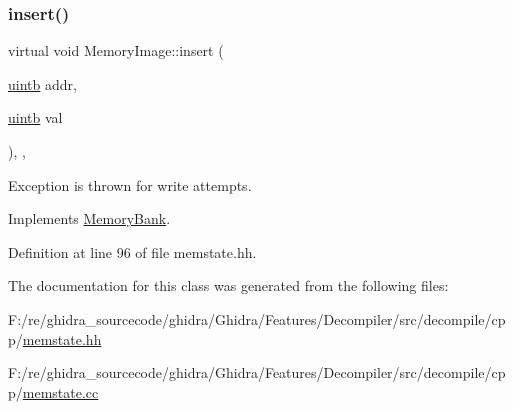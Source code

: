 \subsubsection{\texorpdfstring{insert()}{insert()}}
{\footnotesize\ttfamily virtual void Memory\+Image\+::insert (\begin{DoxyParamCaption}\item[{\mbox{\hyperlink{types_8h_a2db313c5d32a12b01d26ac9b3bca178f}{uintb}}}]{addr,  }\item[{\mbox{\hyperlink{types_8h_a2db313c5d32a12b01d26ac9b3bca178f}{uintb}}}]{val }\end{DoxyParamCaption})\hspace{0.3cm}{\ttfamily [inline]}, {\ttfamily [protected]}, {\ttfamily [virtual]}}



Exception is thrown for write attempts. 



Implements \mbox{\hyperlink{class_memory_bank_abccbb8ba1e2c2ae941b372e90f454e5f}{Memory\+Bank}}.



Definition at line 96 of file memstate.\+hh.



The documentation for this class was generated from the following files\+:\begin{DoxyCompactItemize}
\item 
F\+:/re/ghidra\+\_\+sourcecode/ghidra/\+Ghidra/\+Features/\+Decompiler/src/decompile/cpp/\mbox{\hyperlink{memstate_8hh}{memstate.\+hh}}\item 
F\+:/re/ghidra\+\_\+sourcecode/ghidra/\+Ghidra/\+Features/\+Decompiler/src/decompile/cpp/\mbox{\hyperlink{memstate_8cc}{memstate.\+cc}}\end{DoxyCompactItemize}
